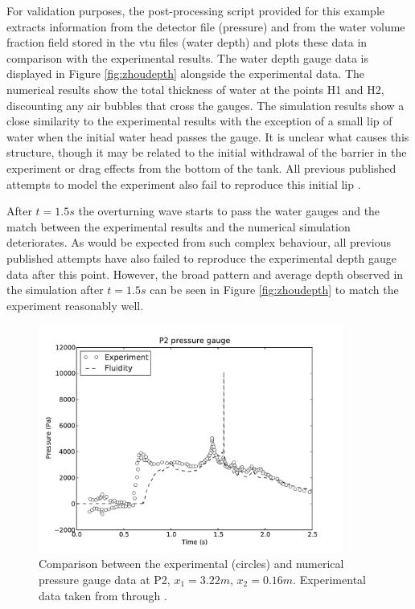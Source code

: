 For validation purposes, the post-processing script provided for this example extracts information from the detector file (pressure) and from the water volume fraction field stored in the vtu files (water depth) and plots these data in comparison with the experimental results. The water depth gauge data is displayed in Figure \ref{fig:zhoudepth} alongside the experimental data.  The numerical results show the total thickness of water at the points H1 and H2, discounting any air bubbles that cross the gauges.  The simulation results show a close similarity to the experimental results with the exception of a small lip of water when the initial water head passes the gauge.  It is unclear what causes this structure, though it may be related to the initial withdrawal of the barrier in the experiment or drag effects from the bottom of the tank.  All previous published attempts to model the experiment also fail to reproduce this initial lip \citep{zhou_nonlinear_1999, lee_numerical_2002, colagrossi_numerical_2003, park_volume-of-fluid_2009}.

After $t=1.5s$ the overturning wave starts to pass the water gauges and the match between the experimental results and the numerical simulation deteriorates. As would be expected from such complex behaviour, all previous published attempts have also failed to reproduce the experimental depth gauge data after this point.  However, the broad pattern and average depth observed in the simulation after $t=1.5s$ can be seen in Figure \ref{fig:zhoudepth} to match the experiment reasonably well.

\begin{figure}[tb]
\begin{center}
\includegraphics[width=10cm]{examples_images/water_collapse/pressure_gauge_P2.pdf}
\caption{Comparison between the experimental (circles) and numerical pressure gauge data at P2, $x_1 = 3.22m$, $x_2 = 0.16m$. Experimental data taken from \citet{zhou_nonlinear_1999} through \citet{park_volume-of-fluid_2009}.}
\label{fig:zhoupressure}
\end{center}
\end{figure}

